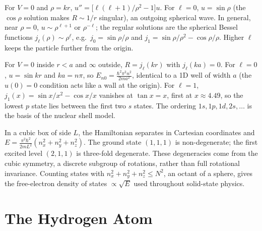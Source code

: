 \begin{example}
For $V = 0$ and $\rho = kr$, $u'' = \bigl[\ell(\ell+1)/\rho^2 - 1\bigr]u$. For $\ell = 0$, $u = \sin\rho$ (the $\cos\rho$ solution makes $R\sim1/r$ singular), an outgoing spherical wave. In general, near $\rho = 0$, $u\sim\rho^{\ell+1}$ or $\rho^{-\ell}$; the regular solutions are the spherical Bessel functions $j_\ell(\rho)\sim\rho^\ell$, e.g.\ $j_0 = \sin\rho/\rho$ and $j_1 = \sin\rho/\rho^2 - \cos\rho/\rho$. Higher $\ell$ keeps the particle further from the origin.
\end{example}

\begin{example}
For $V = 0$ inside $r<a$ and $\infty$ outside, $R = j_\ell(kr)$ with $j_\ell(ka) = 0$. For $\ell = 0$, $u = \sin kr$ and $ka = n\pi$, so $E_{n0} = \frac{\hbar^2\pi^2n^2}{2ma^2}$, identical to a 1D well of width $a$ (the $u(0) = 0$ condition acts like a wall at the origin). For $\ell = 1$, $j_1(x) = \sin x/x^2 - \cos x/x$ vanishes at $\tan x = x$, first at $x\approx4.49$, so the lowest $p$ state lies between the first two $s$ states. The ordering $1s,1p,1d,2s,\ldots$ is the basis of the nuclear shell model.
\end{example}

\begin{example}
In a cubic box of side $L$, the Hamiltonian separates in Cartesian coordinates and $E = \frac{\pi^2\hbar^2}{2mL^2}(n_x^2+n_y^2+n_z^2)$. The ground state $(1,1,1)$ is non-degenerate; the first excited level $(2,1,1)$ is three-fold degenerate. These degeneracies come from the cubic symmetry, a discrete subgroup of rotations, rather than full rotational invariance. Counting states with $n_x^2+n_y^2+n_z^2\le N^2$, an octant of a sphere, gives the free-electron density of states $\propto\sqrt{E}$ used throughout solid-state physics.
\end{example}

\section{The Hydrogen Atom}

